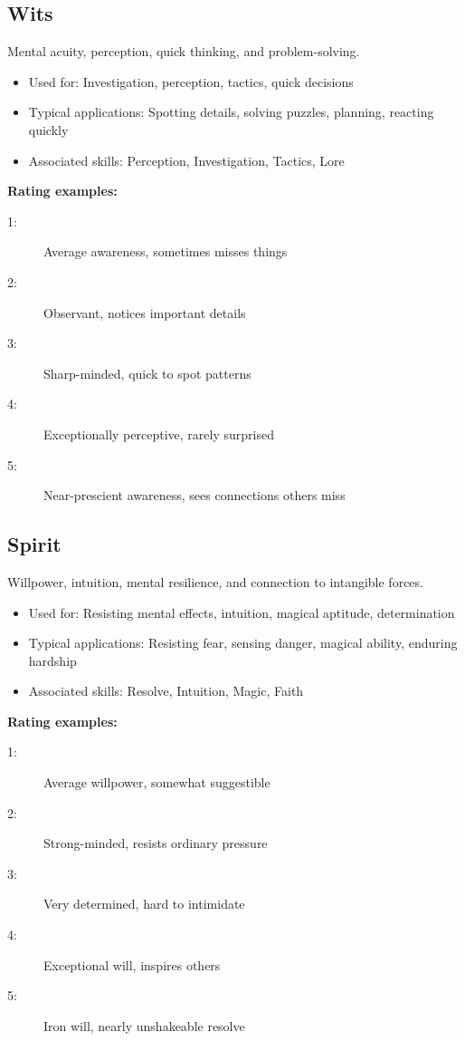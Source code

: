 \documentclass[11pt,twoside,openany]{book}
\begin{document}
\subsection*{Wits}

Mental acuity, perception, quick thinking, and problem-solving.
\begin{itemize}
\item Used for: Investigation, perception, tactics, quick decisions
\item Typical applications: Spotting details, solving puzzles, planning, reacting quickly
\item Associated skills: Perception, Investigation, Tactics, Lore
\end{itemize}

\textbf{Rating examples:}
\begin{description}
\item[1:] Average awareness, sometimes misses things
\item[2:] Observant, notices important details
\item[3:] Sharp-minded, quick to spot patterns
\item[4:] Exceptionally perceptive, rarely surprised
\item[5:] Near-prescient awareness, sees connections others miss
\end{description}

\subsection*{Spirit}

Willpower, intuition, mental resilience, and connection to intangible forces.
\begin{itemize}
\item Used for: Resisting mental effects, intuition, magical aptitude, determination
\item Typical applications: Resisting fear, sensing danger, magical ability, enduring hardship
\item Associated skills: Resolve, Intuition, Magic, Faith
\end{itemize}

\textbf{Rating examples:}
\begin{description}
\item[1:] Average willpower, somewhat suggestible
\item[2:] Strong-minded, resists ordinary pressure
\item[3:] Very determined, hard to intimidate
\item[4:] Exceptional will, inspires others
\item[5:] Iron will, nearly unshakeable resolve
\end{description}
\end{document}
